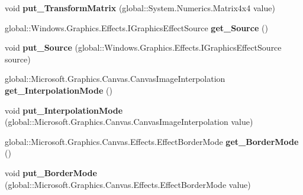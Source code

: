 \begin{DoxyCompactItemize}
void {\bfseries put\+\_\+\+Transform\+Matrix} (global\+::\+System.\+Numerics.\+Matrix4x4 value)
\item 
\mbox{\label{interface_microsoft_1_1_graphics_1_1_canvas_1_1_effects_1_1_i_transform3_d_effect_a5d51e9e7c23c1b2a2f1342b8c9101cae}} 
global\+::\+Windows.\+Graphics.\+Effects.\+I\+Graphics\+Effect\+Source {\bfseries get\+\_\+\+Source} ()
\item 
\mbox{\label{interface_microsoft_1_1_graphics_1_1_canvas_1_1_effects_1_1_i_transform3_d_effect_a3c2e3d14006f206763b75fd09797eb37}} 
void {\bfseries put\+\_\+\+Source} (global\+::\+Windows.\+Graphics.\+Effects.\+I\+Graphics\+Effect\+Source source)
\item 
\mbox{\label{interface_microsoft_1_1_graphics_1_1_canvas_1_1_effects_1_1_i_transform3_d_effect_aefc252bdfd3579f343b3a345dba1a4f3}} 
global\+::\+Microsoft.\+Graphics.\+Canvas.\+Canvas\+Image\+Interpolation {\bfseries get\+\_\+\+Interpolation\+Mode} ()
\item 
\mbox{\label{interface_microsoft_1_1_graphics_1_1_canvas_1_1_effects_1_1_i_transform3_d_effect_a8ccce526ac8bfcfef799e807637ad92b}} 
void {\bfseries put\+\_\+\+Interpolation\+Mode} (global\+::\+Microsoft.\+Graphics.\+Canvas.\+Canvas\+Image\+Interpolation value)
\item 
\mbox{\label{interface_microsoft_1_1_graphics_1_1_canvas_1_1_effects_1_1_i_transform3_d_effect_a6e3886f8c1a115e3734fb2df7df7fc38}} 
global\+::\+Microsoft.\+Graphics.\+Canvas.\+Effects.\+Effect\+Border\+Mode {\bfseries get\+\_\+\+Border\+Mode} ()
\item 
\mbox{\label{interface_microsoft_1_1_graphics_1_1_canvas_1_1_effects_1_1_i_transform3_d_effect_a25a24175bd4b6592a9795eee3b7b7566}} 
void {\bfseries put\+\_\+\+Border\+Mode} (global\+::\+Microsoft.\+Graphics.\+Canvas.\+Effects.\+Effect\+Border\+Mode value)

\end{DoxyCompactItemize}
